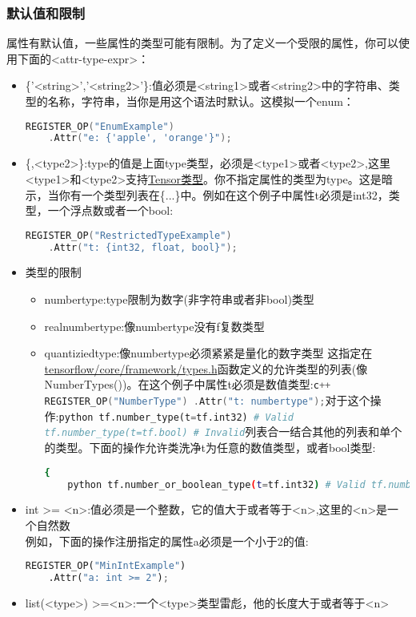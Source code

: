 \subsubsection{默认值和限制}
属性有默认值，一些属性的类型可能有限制。为了定义一个受限的属性，你可以使用下面的<attr-type-expr>：
\begin{itemize}
\item \{'<string>','<string2>'\}:值必须是<string1>或者<string2>中的字符串、类型的名称，字符串，当你是用这个语法时默认。这模拟一个enum：
\begin{lstlisting}[language=C++]
REGISTER_OP("EnumExample")
    .Attr("e: {'apple', 'orange'}");

\end{lstlisting}
\item \{<type1>,<type2>\}:type的值是上面type类型，必须是<type1>或者<type2>,这里<type1>和<type2>支持\href{https://www.tensorflow.org/api_docs/python/tf/DType?hl=zh-cn}{Tensor类型}。你不指定属性的类型为type。这是暗示，当你有一个类型列表在\{...\}中。例如在这个例子中属性t必须是int32，类型，一个浮点数或者一个bool:
\begin{lstlisting}[language=C++]
REGISTER_OP("RestrictedTypeExample")
    .Attr("t: {int32, float, bool}");

\end{lstlisting}
\item 类型的限制
\begin{itemize}
	\item numbertype:type限制为数字(非字符串或者非bool)类型
	\item realnumbertype:像numbertype没有f复数类型
	\item quantiziedtype:像numbertype必须紧紧是量化的数字类型
	这指定在\href{https://www.github.com/tensorflow/tensorflow/blob/r1.4/tensorflow/core/framework/types.h}{tensorflow/core/framework/types.h}函数定义的允许类型的列表(像NumberTypes())。在这个例子中属性t必须是数值类型:\lstinline[language=C++]{c++ REGISTER_OP("NumberType") .Attr("t: numbertype");}对于这个操作:\lstinline[language=Python]{python tf.number_type(t=tf.int32) # Valid tf.number_type(t=tf.bool) # Invalid}列表合一结合其他的列表和单个的类型。下面的操作允许类洗净t为任意的数值类型，或者bool类型:
	\begin{lstlisting}[language=Bash]{
	python tf.number_or_boolean_type(t=tf.int32) # Valid tf.number_or_boolean_type(t=tf.bool) # Valid tf.number_or_boolean_type(t=tf.string) # Invalid}
	\end{lstlisting}
\end{itemize}
\item int >= <n>:值必须是一个整数，它的值大于或者等于<n>,这里的<n>是一个自然数\\
例如，下面的操作注册指定的属性a必须是一个小于2的值:
\begin{lstlisting}[language=Python]
REGISTER_OP("MinIntExample")
    .Attr("a: int >= 2");

\end{lstlisting}
\item list(<type>) >=<n>:一个<type>类型雷彪，他的长度大于或者等于<n>
\end{itemize}
